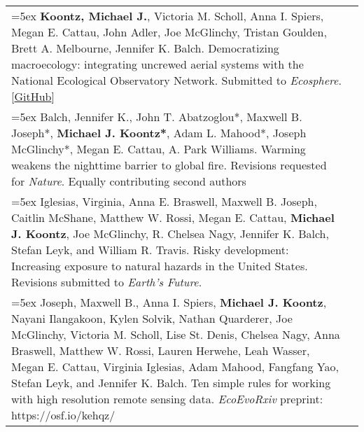 \begin{longtable}{@{} >{\raggedright}p{6.25in} >{\raggedleft}X @{}}

\hangindent=5ex \textbf{Koontz, Michael J.}, Victoria M. Scholl, Anna I. Spiers, Megan E. Cattau, John Adler, Joe McGlinchy, Tristan Goulden, Brett A. Melbourne, Jennifer K. Balch. Democratizing macroecology: integrating uncrewed aerial systems with the National Ecological Observatory Network. Submitted to \emph{Ecosphere}. [\textcolor{blue}{\href{https://github.com/mikoontz/neon-drone-workflow}{GitHub}}] & \tabularnewline

\hangindent=5ex Balch, Jennifer K., John T. Abatzoglou*, Maxwell B. Joseph*, \textbf{Michael J. Koontz*}, Adam L. Mahood*, Joseph McGlinchy*, Megan E. Cattau, A. Park Williams. Warming weakens the nighttime barrier to global fire. Revisions requested for \emph{Nature}. 
\newline *Equally contributing second authors & \tabularnewline

\hangindent=5ex Iglesias, Virginia, Anna E. Braswell, Maxwell B. Joseph, Caitlin McShane, Matthew W. Rossi, Megan E. Cattau, \textbf{Michael J. Koontz}, Joe McGlinchy, R. Chelsea Nagy, Jennifer K. Balch, Stefan Leyk, and William R. Travis. Risky development: Increasing exposure to natural hazards in the United States. Revisions submitted to \emph{Earth's Future}. & \tabularnewline

\hangindent=5ex Joseph, Maxwell B., Anna I. Spiers, \textbf{Michael J. Koontz}, Nayani Ilangakoon, Kylen Solvik, Nathan Quarderer, Joe McGlinchy, Victoria M. Scholl, Lise St. Denis, Chelsea Nagy, Anna Braswell, Matthew W. Rossi, Lauren Herwehe, Leah Wasser, Megan E. Cattau, Virginia Iglesias, Adam Mahood, Fangfang Yao, Stefan Leyk, and Jennifer K. Balch. Ten simple rules for working with high resolution remote sensing data.  \newline \emph{EcoEvoRxiv} preprint: https://osf.io/kehqz/ & \tabularnewline

\end{longtable}
